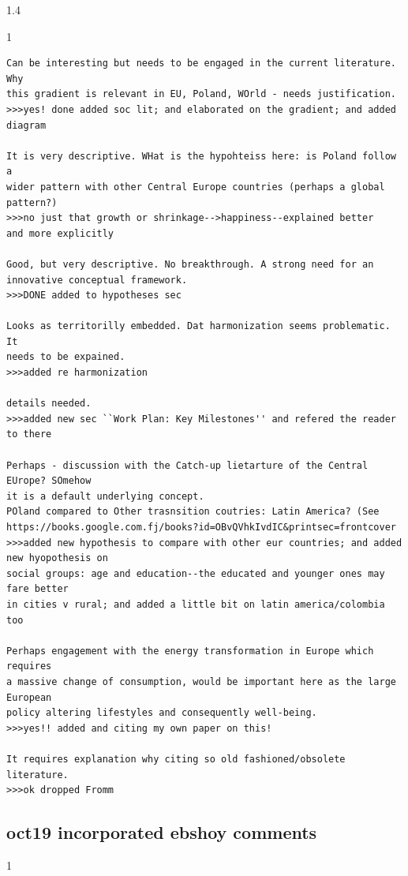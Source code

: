 \documentclass[10pt, letterpaper]{article}
\begin{document}
\begin{spacing}{1.4}
\begin{scriptsize}
\begin{spacing}{1}
\begin{verbatim}
Can be interesting but needs to be engaged in the current literature. Why
this gradient is relevant in EU, Poland, WOrld - needs justification.
>>>yes! done added soc lit; and elaborated on the gradient; and added diagram

It is very descriptive. WHat is the hypohteiss here: is Poland follow a
wider pattern with other Central Europe countries (perhaps a global
pattern?)
>>>no just that growth or shrinkage-->happiness--explained better
and more explicitly 

Good, but very descriptive. No breakthrough. A strong need for an
innovative conceptual framework.
>>>DONE added to hypotheses sec

Looks as territorilly embedded. Dat harmonization seems problematic. It
needs to be expained.
>>>added re harmonization

details needed.
>>>added new sec ``Work Plan: Key Milestones'' and refered the reader to there

Perhaps - discussion with the Catch-up lietarture of the Central EUrope? SOmehow
it is a default underlying concept.
POland compared to Other trasnsition coutries: Latin America? (See
https://books.google.com.fj/books?id=OBvQVhkIvdIC&printsec=frontcover
>>>added new hypothesis to compare with other eur countries; and added new hyopothesis on
social groups: age and education--the educated and younger ones may fare better
in cities v rural; and added a little bit on latin america/colombia too

Perhaps engagement with the energy transformation in Europe which requires
a massive change of consumption, would be important here as the large European
policy altering lifestyles and consequently well-being.
>>>yes!! added and citing my own paper on this!

It requires explanation why citing so old fashioned/obsolete
literature.
>>>ok dropped Fromm
\end{verbatim}
\end{spacing}
\end{scriptsize}

\subsection{oct19 incorporated ebshoy comments} 


\begin{scriptsize}
\begin{spacing}{1} 
\begin{verbatim}


\end{verbatim}
\end{spacing}
\end{scriptsize}
\end{spacing}
\end{document}
